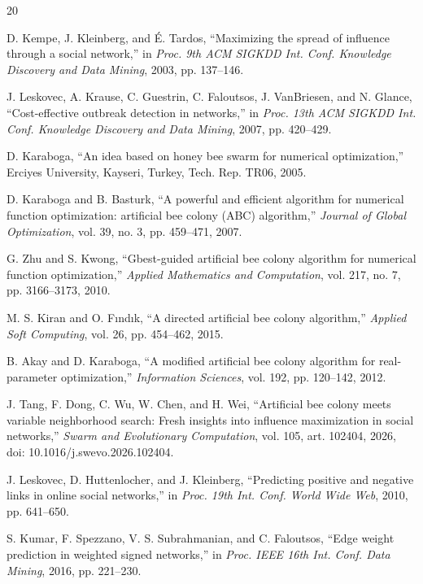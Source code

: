 \documentclass[journal,letterpaper,10pt]{IEEEtran}
\begin{document}
\begin{thebibliography}{20}

D. Kempe, J. Kleinberg, and \'E. Tardos, ``Maximizing the spread of influence through a social network,'' in \emph{Proc. 9th ACM SIGKDD Int. Conf. Knowledge Discovery and Data Mining}, 2003, pp. 137--146.

J. Leskovec, A. Krause, C. Guestrin, C. Faloutsos, J. VanBriesen, and N. Glance, ``Cost-effective outbreak detection in networks,'' in \emph{Proc. 13th ACM SIGKDD Int. Conf. Knowledge Discovery and Data Mining}, 2007, pp. 420--429.

D. Karaboga, ``An idea based on honey bee swarm for numerical optimization,'' Erciyes University, Kayseri, Turkey, Tech. Rep. TR06, 2005.

D. Karaboga and B. Basturk, ``A powerful and efficient algorithm for numerical function optimization: artificial bee colony (ABC) algorithm,'' \emph{Journal of Global Optimization}, vol. 39, no. 3, pp. 459--471, 2007.

G. Zhu and S. Kwong, ``Gbest-guided artificial bee colony algorithm for numerical function optimization,'' \emph{Applied Mathematics and Computation}, vol. 217, no. 7, pp. 3166--3173, 2010.

M. S. Kiran and O. F{\i}nd{\i}k, ``A directed artificial bee colony algorithm,'' \emph{Applied Soft Computing}, vol. 26, pp. 454--462, 2015.

B. Akay and D. Karaboga, ``A modified artificial bee colony algorithm for real-parameter optimization,'' \emph{Information Sciences}, vol. 192, pp. 120--142, 2012.

J. Tang, F. Dong, C. Wu, W. Chen, and H. Wei, ``Artificial bee colony meets variable neighborhood search: Fresh insights into influence maximization in social networks,'' \emph{Swarm and Evolutionary Computation}, vol. 105, art. 102404, 2026, doi: 10.1016/j.swevo.2026.102404.

J. Leskovec, D. Huttenlocher, and J. Kleinberg, ``Predicting positive and negative links in online social networks,'' in \emph{Proc. 19th Int. Conf. World Wide Web}, 2010, pp. 641--650.

S. Kumar, F. Spezzano, V. S. Subrahmanian, and C. Faloutsos, ``Edge weight prediction in weighted signed networks,'' in \emph{Proc. IEEE 16th Int. Conf. Data Mining}, 2016, pp. 221--230.


\end{thebibliography}
\end{document}
